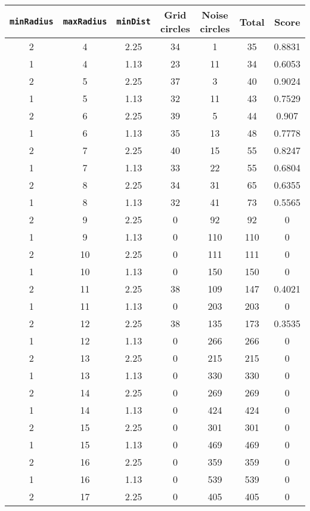 \documentclass[letterpaper, 12pt]{article}
\begin{document}
\begin{longtable}{|c|c|c|c|c|c|c|}
\hline
\textbf{\texttt{minRadius}} & \textbf{\texttt{maxRadius}} & \textbf{\texttt{minDist}} & \textbf{Grid circles} & \textbf{Noise circles} & \textbf{Total} & \textbf{Score} \\
\hline
2 & 4 & 2.25 & 34 & 1 & 35 & 0.8831 \\
\hline
1 & 4 & 1.13 & 23 & 11 & 34 & 0.6053 \\
\hline
2 & 5 & 2.25 & 37 & 3 & 40 & 0.9024 \\
\hline
1 & 5 & 1.13 & 32 & 11 & 43 & 0.7529 \\
\hline
2 & 6 & 2.25 & 39 & 5 & 44 & 0.907 \\
\hline
1 & 6 & 1.13 & 35 & 13 & 48 & 0.7778 \\
\hline
2 & 7 & 2.25 & 40 & 15 & 55 & 0.8247 \\
\hline
1 & 7 & 1.13 & 33 & 22 & 55 & 0.6804 \\
\hline
2 & 8 & 2.25 & 34 & 31 & 65 & 0.6355 \\
\hline
1 & 8 & 1.13 & 32 & 41 & 73 & 0.5565 \\
\hline
2 & 9 & 2.25 & 0 & 92 & 92 & 0 \\
\hline
1 & 9 & 1.13 & 0 & 110 & 110 & 0 \\
\hline
2 & 10 & 2.25 & 0 & 111 & 111 & 0 \\
\hline
1 & 10 & 1.13 & 0 & 150 & 150 & 0 \\
\hline
2 & 11 & 2.25 & 38 & 109 & 147 & 0.4021 \\
\hline
1 & 11 & 1.13 & 0 & 203 & 203 & 0 \\
\hline
2 & 12 & 2.25 & 38 & 135 & 173 & 0.3535 \\
\hline
1 & 12 & 1.13 & 0 & 266 & 266 & 0 \\
\hline
2 & 13 & 2.25 & 0 & 215 & 215 & 0 \\
\hline
1 & 13 & 1.13 & 0 & 330 & 330 & 0 \\
\hline
2 & 14 & 2.25 & 0 & 269 & 269 & 0 \\
\hline
1 & 14 & 1.13 & 0 & 424 & 424 & 0 \\
\hline
2 & 15 & 2.25 & 0 & 301 & 301 & 0 \\
\hline
1 & 15 & 1.13 & 0 & 469 & 469 & 0 \\
\hline
2 & 16 & 2.25 & 0 & 359 & 359 & 0 \\
\hline
1 & 16 & 1.13 & 0 & 539 & 539 & 0 \\
\hline
2 & 17 & 2.25 & 0 & 405 & 405 & 0 \\
\hline

\end{longtable}
\end{document}
